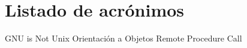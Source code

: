 \chapter{Listado de acrónimos}

\begin{acronym}[XXXXXXXX]
       {\acs{GNU} is Not Unix}
        {Orientación a Objetos}
       {Remote Procedure Call}
\end{acronym}




